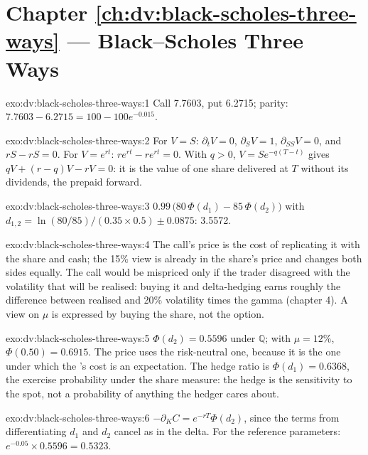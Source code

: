 \section*{Chapter \ref{ch:dv:black-scholes-three-ways} --- Black--Scholes Three Ways}

\begin{solution}{exo:dv:black-scholes-three-ways:1}
Call 7.7603, put 6.2715; parity: $7.7603-6.2715=100-100e^{-0.015}$.
\end{solution}

\begin{solution}{exo:dv:black-scholes-three-ways:2}
For $V=S$: $\partial_tV=0$, $\partial_SV=1$, $\partial_{SS}V=0$, and $rS-rS=0$. For
$V=e^{rt}$: $re^{rt}-re^{rt}=0$. With $q>0$, $V=Se^{-q(T-t)}$ gives
$qV+(r-q)V-rV=0$: it is the value of one share delivered at $T$ without its
dividends, the prepaid forward.
\end{solution}

\begin{solution}{exo:dv:black-scholes-three-ways:3}
$0.99\,\bigl(80\,\Phi(d_1)-85\,\Phi(d_2)\bigr)$ with
$d_{1,2}=\ln(80/85)/(0.35\times0.5)\pm0.0875$: 3.5572.
\end{solution}

\begin{solution}{exo:dv:black-scholes-three-ways:4}
The call's price is the cost of replicating it with the share and cash; the 15\%
view is already in the share's price and changes both sides equally. The call
would be mispriced only if the trader disagreed with the volatility that will be
realised: buying it and delta-hedging earns roughly the difference between
realised and 20\% volatility times the gamma (chapter 4). A view on $\mu$ is
expressed by buying the share, not the option.
\end{solution}

\begin{solution}{exo:dv:black-scholes-three-ways:5}
$\Phi(d_2)=0.5596$ under $\mathbb Q$; with $\mu=12\%$, $\Phi(0.50)=0.6915$. The price
uses the risk-neutral one, because it is the one under which the 's cost is an expectation. The hedge ratio is $\Phi(d_1)=0.6368$, the
exercise probability under the share measure: the hedge is the sensitivity to
the spot, not a probability of anything the hedger cares about.
\end{solution}

\begin{solution}{exo:dv:black-scholes-three-ways:6}
$-\partial_KC=e^{-rT}\Phi(d_2)$, since the terms from differentiating $d_1$ and $d_2$
cancel as in the delta. For the reference parameters: $e^{-0.05}\times0.5596=0.5323$.
\end{solution}

